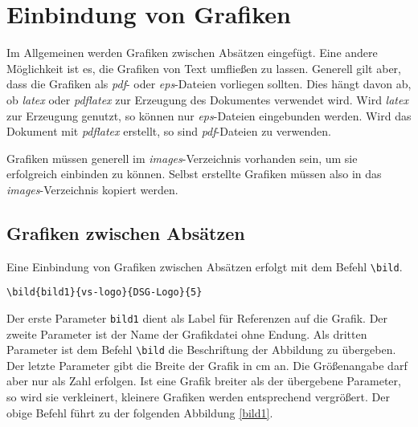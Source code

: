 %
\section{Einbindung von Grafiken}
%
Im Allgemeinen werden Grafiken zwischen Absätzen eingefügt. Eine andere
Möglichkeit ist es, die Grafiken von Text umfließen zu lassen. Generell gilt
aber, dass die Grafiken als \emph{pdf}- oder \emph{eps}-Dateien vorliegen
sollten. Dies hängt davon ab, ob \emph{latex} oder \emph{pdflatex} zur Erzeugung
des Dokumentes verwendet wird. Wird \emph{latex} zur Erzeugung genutzt, so
können nur \emph{eps}-Dateien eingebunden werden. Wird das Dokument mit
\emph{pdflatex} erstellt, so sind \emph{pdf}-Dateien zu verwenden.

Grafiken müssen generell im \emph{images}-Verzeichnis vorhanden sein, um sie
erfolgreich einbinden zu können. Selbst erstellte Grafiken müssen also in das
\emph{images}-Verzeichnis kopiert werden.

\subsection{Grafiken zwischen Absätzen}
%
Eine Einbindung von Grafiken zwischen Absätzen erfolgt mit dem Befehl
\texttt{\textbackslash bild}.
\begin{verbatim}
\bild{bild1}{vs-logo}{DSG-Logo}{5}
\end{verbatim}
Der erste Parameter \texttt{bild1} dient als Label für Referenzen auf die
Grafik. Der zweite Parameter ist der Name der Grafikdatei ohne Endung. Als
dritten Parameter ist dem Befehl \texttt{\textbackslash bild} die Beschriftung
der Abbildung zu übergeben. Der letzte Parameter gibt
die Breite der Grafik in cm an. Die Größenangabe darf aber nur als Zahl erfolgen.
Ist eine Grafik breiter als der übergebene Parameter, so wird sie verkleinert, kleinere Grafiken werden
entsprechend vergrößert. Der obige Befehl führt zu der folgenden Abbildung
\ref{bild1}.


